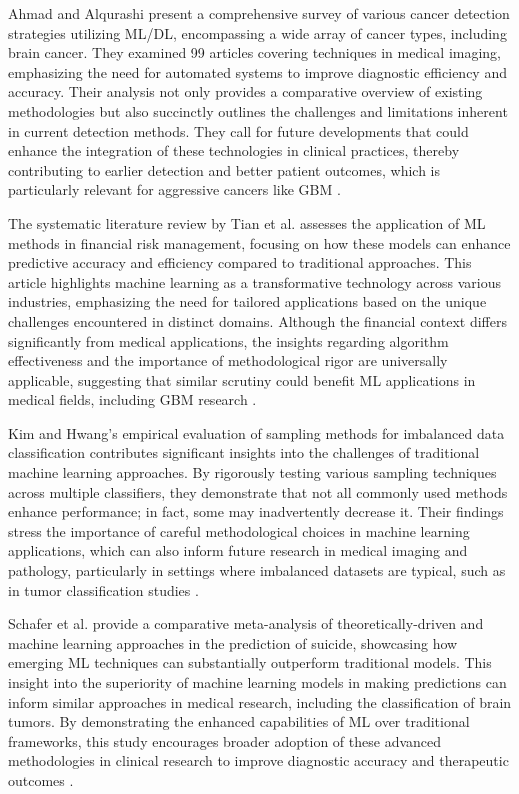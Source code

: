 \documentclass[runningheads]{llncs}
\begin{document}
Ahmad and Alqurashi present a comprehensive survey of various cancer detection strategies utilizing ML/DL, encompassing a wide array of cancer types, including brain cancer. They examined 99 articles covering techniques in medical imaging, emphasizing the need for automated systems to improve diagnostic efficiency and accuracy. Their analysis not only provides a comparative overview of existing methodologies but also succinctly outlines the challenges and limitations inherent in current detection methods. They call for future developments that could enhance the integration of these technologies in clinical practices, thereby contributing to earlier detection and better patient outcomes, which is particularly relevant for aggressive cancers like GBM \cite{Istiak_2024}.

The systematic literature review by Tian et al. assesses the application of ML methods in financial risk management, focusing on how these models can enhance predictive accuracy and efficiency compared to traditional approaches. This article highlights machine learning as a transformative technology across various industries, emphasizing the need for tailored applications based on the unique challenges encountered in distinct domains. Although the financial context differs significantly from medical applications, the insights regarding algorithm effectiveness and the importance of methodological rigor are universally applicable, suggesting that similar scrutiny could benefit ML applications in medical fields, including GBM research \cite{Xu_2024}.

Kim and Hwang's empirical evaluation of sampling methods for imbalanced data classification contributes significant insights into the challenges of traditional machine learning approaches. By rigorously testing various sampling techniques across multiple classifiers, they demonstrate that not all commonly used methods enhance performance; in fact, some may inadvertently decrease it. Their findings stress the importance of careful methodological choices in machine learning applications, which can also inform future research in medical imaging and pathology, particularly in settings where imbalanced datasets are typical, such as in tumor classification studies \cite{Misuk_2022}.

Schafer et al. provide a comparative meta-analysis of theoretically-driven and machine learning approaches in the prediction of suicide, showcasing how emerging ML techniques can substantially outperform traditional models. This insight into the superiority of machine learning models in making predictions can inform similar approaches in medical research, including the classification of brain tumors. By demonstrating the enhanced capabilities of ML over traditional frameworks, this study encourages broader adoption of these advanced methodologies in clinical research to improve diagnostic accuracy and therapeutic outcomes \cite{Katherine_2021}.
\end{document}
